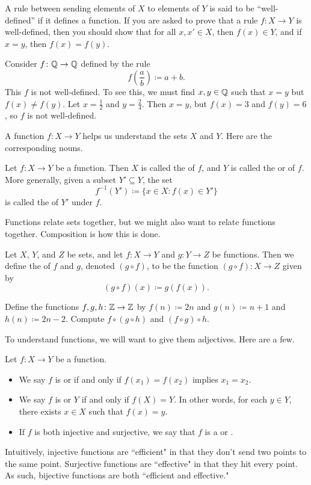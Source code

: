 \documentclass[../main.tex]{subfiles}
\begin{document}
A rule between sending elements of $X$ to elements of $Y$ is said to be ``well-defined'' if it defines a function. If you are asked to prove that a rule $f\colon X \to Y$ is well-defined, then you should show that for all $x, x' \in X$, then $f(x) \in Y$, and if $x = y$, then $f(x) = f(y)$.
\begin{nex}
    Consider $f\colon \mathbb Q \to \mathbb Q$ defined by the rule
    \[f\left(\frac{a}{b}\right) \coloneqq a + b.\]
    This $f$ is not well-defined. To see this, we must find $x, y \in \mathbb Q$ such that $x = y$ but $f(x) \neq f(y)$. Let $x = \frac{1}{2}$ and $y = \frac{2}{4}$. Then $x = y$, but $f(x) = 3$ and $f(y) = 6$, so $f$ is not well-defined.
\end{nex}
A function $f\colon X\to Y$ helps us understand the sets $X$ and $Y$. Here are the corresponding nouns.
\begin{definition}
    Let $f\colon X\to Y$ be a function. Then $X$ is called the  of $f$, and $Y$ is called the  or  of $f$. More generally, given a subset $Y'\subseteq Y$, the set
    \[f^{-1}(Y')\coloneqq\{x\in X:f(x)\in Y'\}\]
    is called the  of $Y'$ under $f$.
\end{definition}
Functions relate sets together, but we might also want to relate functions together. Composition is how this is done.
\begin{definition}[composition]
    Let $X$, $Y$, and $Z$ be sets, and let $f\colon X\to Y$ and $g\colon Y\to Z$ be functions. Then we define the  of $f$ and $g$, denoted $(g\circ f)$, to be the function $(g\circ f)\colon X\to Z$ given by
    \[(g\circ f)(x)\coloneqq g(f(x)).\]
\end{definition}
\begin{exe}
    Define the functions $f,g,h\colon\mathbb Z\to\mathbb Z$ by $f(n)\coloneqq2n$ and $g(n)\coloneqq n+1$ and $h(n)\coloneqq 2n-2$. Compute $f\circ(g\circ h)$ and $(f\circ g)\circ h$.
\end{exe}
To understand functions, we will want to give them adjectives. Here are a few.
\begin{definition}
    Let $f\colon X \to Y$ be a function.
    \begin{itemize}
        \item We say $f$ is  or  if and only if $f(x_1) = f(x_2)$ implies $x_1 = x_2$.
        \item We say $f$ is  or  $Y$ if and only if $f(X) = Y$. In other words, for each $y\in Y$, there exists $x\in X$ such that $f(x)=y$.
        \item If $f$ is both injective and surjective, we say that $f$ is a  or .
    \end{itemize}
\end{definition}
Intuitively, injective functions are ``efficient" in that they don't send two points to the same point. Surjective functions are ``effective" in that they hit every point. As such, bijective functions are both ``efficient and effective."
\end{document}

